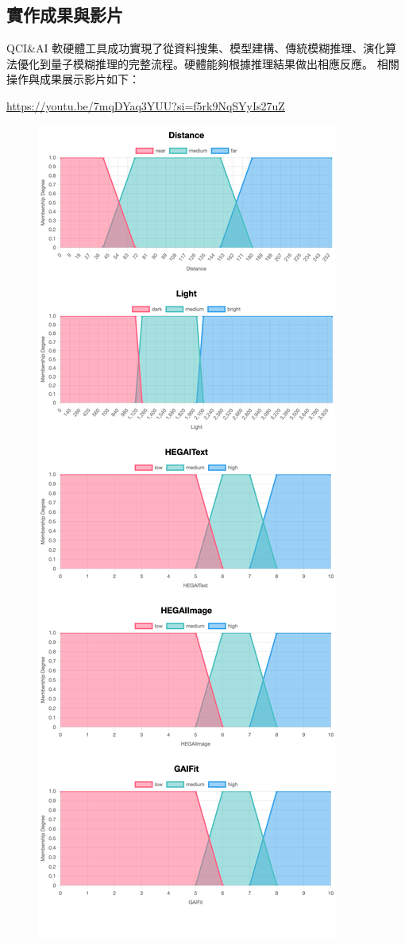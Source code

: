 \documentclass[twocolumn,11pt,a4paper]{article}
\begin{document}
\subsection{實作成果與影片}
QCI\&AI 軟硬體工具成功實現了從資料搜集、模型建構、傳統模糊推理、演化算法優化到量子模糊推理的完整流程。硬體能夠根據推理結果做出相應反應。
相關操作與成果展示影片如下：

\noindent \href{https://youtu.be/7mqDYaq3YUU?si=f5rk9NqSYyIs27uZ}{https://youtu.be/7mqDYaq3YUU?si=f5rk9NqSYyIs27uZ}

\begin{figure}[htbp]
    \centering
    \begin{minipage}[t]{0.48\textwidth}
        \centering
        \includegraphics[width=\linewidth]{res/image/all_BT.png}

\end{minipage}
\end{figure}
\end{document}
